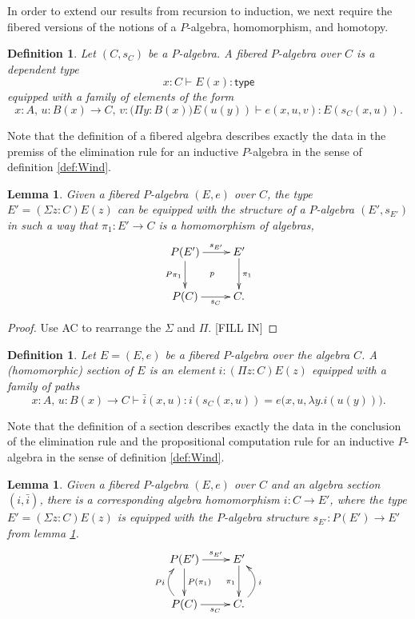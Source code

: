 \documentclass[reqno,10pt,a4paper,oneside]{amsart}
\numberwithin{equation}{section}
\theoremstyle{mythm}
\newtheorem{lemma}[theorem]{Lemma}
\theoremstyle{mydef}
\newtheorem{definition}[theorem]{Definition}
\theoremstyle{myrmk}
\newcommand{\peq}{=}
\newcommand{\co}{\colon}
\newcommand{\type}{\mathsf{type}}
\begin{document}

In order to extend our results from recursion to induction, we next require the fibered versions of the notions of a $P$-algebra, homomorphism, and homotopy.

\begin{definition} \label{def:fibalg}
Let $(C, s_C)$ be a $P$-algebra. A \emph{fibered $P$-algebra} over $C$ is a dependent type
\[
x : C \vdash E(x) \co \type
\]
equipped with a family of elements of the form
\[
x:A,\, u : B(x) \to C,\, v : \big(\Pi{y:B(x)}\big) E(u(y)) \vdash e(x,u,v) :E(s_C(x,u)).
\]
\end{definition}

Note that the definition of a fibered algebra describes exactly the data in the premiss of the elimination rule for an inductive $P$-algebra in the sense of definition \ref{def:Wind}. 

\begin{lemma}\label{lem:fibalg}
Given a fibered $P$-algebra $(E, e)$ over $C$, the type $E' = (\Sigma z : C) E(z)$ can be equipped with the structure of a $P$-algebra $(E', s_{E'})$ in such a way that $\pi_1 : E'\to C$ is a homomorphism of algebras,
\[
\xymatrix{
P(E') \ar[d]_{P\pi_1} \ar[r]^-{s_{E'}} \ar@{}[rd]|{p} & E' \ar[d]^{\pi_1} \\ 
P(C) \ar[r]_-{s_C} & C.}
 \]
\end{lemma}

\begin{proof}
Use AC to rearrange the $\Sigma$ and $\Pi$.
[FILL IN]
\end{proof}

\begin{definition} \label{def:fibalgsection} Let $E = (E, e)$ be a fibered $P$-algebra over the algebra $C$.  A \emph{(homomorphic) section} of $E$ is an element $i \co (\Pi z \co C) E(z)$ equipped with a family of paths $$ x:A,\, u : B(x) \to C \vdash \bar{i}(x, u) : i(s_C(x,u)) \peq e\big(x,u,\lambda{y}.i(u(y))\big).$$
\end{definition} 

Note that the definition of a section describes exactly the data in the conclusion of the elimination rule and the propositional computation rule for an inductive $P$-algebra in the sense of definition \ref{def:Wind}. 

\begin{lemma}\label{lem:fibalghom}
Given a fibered $P$-algebra $(E, e)$ over $C$ and an algebra section $(i, \bar{i})$, there is a corresponding algebra homomorphism $i : C\to E'$, where the type $E' = (\Sigma z : C) E(z)$ is equipped with the $P$-algebra structure $s_{E'} :P(E')\to E'$ from lemma \ref{lem:fibalg}.
\[
\xymatrix{
P(E') \ar[d]^{P(\pi_1)} \ar[r]^-{s_{E'}} %
	 & E' \ar[d]_{\pi_1} \\ 
P(C)  \ar@/^1.2pc/[u]^{Pi} \ar[r]_-{s_C} & C  \ar@/_1.2pc/[u]_{i}.}
 \]
\end{lemma}
\end{document}
